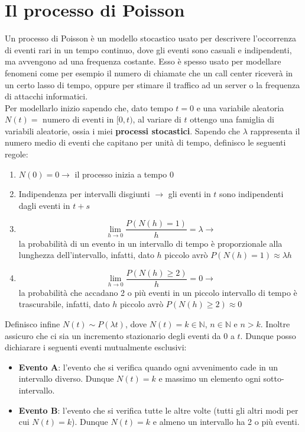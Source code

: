 \documentclass[11pt]{report}
\begin{document}
\section{Il processo di Poisson}
Un processo di Poisson è un modello stocastico usato per descrivere l'occorrenza di eventi rari in un tempo continuo, dove gli eventi sono casuali e indipendenti, ma avvengono ad una frequenza costante. Esso è spesso usato per modellare fenomeni come per esempio il numero di chiamate che un call center riceverà in un certo lasso di tempo, oppure per stimare il traffico ad un server o la frequenza di attacchi informatici.\\
Per modellarlo inizio sapendo che, dato tempo $t=0$ e una variabile aleatoria $N(t)=\text{ numero di eventi in } [0,t)$, al variare di $t$ ottengo una famiglia di variabili aleatorie, ossia i miei \textbf{processi stocastici}. Sapendo che $\lambda$ rappresenta il numero medio di eventi che capitano per unità di tempo, definisco le seguenti regole:
\begin{enumerate}
    \item $N(0) = 0 \longrightarrow$ il processo inizia a tempo 0
    \item Indipendenza per intervalli disgiunti $\longrightarrow$ gli eventi in $t$ sono indipendenti dagli eventi in $t+s$
    \item \[ \lim_{h \rightarrow 0} \frac{P(N(h)=1)}{h} = \lambda \longrightarrow \] la probabilità di un evento in un intervallo di tempo è proporzionale alla lunghezza dell'intervallo, infatti, dato $h$ piccolo avrò $P(N(h)=1) \approx \lambda h$
    \item \[ \lim_{h \rightarrow 0} \frac{P(N(h) \geq 2)}{h} = 0 \longrightarrow \] la probabilità che accadano 2 o più eventi in un piccolo intervallo di tempo è trascurabile, infatti, dato $h$ piccolo avrò $P(N(h) \geq 2) \approx 0$
\end{enumerate}
Definisco infine $N(t) \sim P(\lambda t)$, dove $N(t) = k \in \mathbb{N}$, $n \in \mathbb{N}$ e $n > k$. Inoltre assicuro che ci sia un incremento stazionario degli eventi da 0 a $t$. Dunque posso dichiarare i seguenti eventi mutualmente esclusivi:
\begin{itemize}
    \item \textbf{Evento A}: l'evento che si verifica quando ogni avvenimento cade in un intervallo diverso. Dunque $N(t)=k$ e massimo un elemento ogni sotto-intervallo.
    \item \textbf{Evento B}: l'evento che si verifica tutte le altre volte (tutti gli altri modi per cui $N(t)=k$). Dunque $N(t)=k$ e almeno un intervallo ha 2 o più eventi.
\end{itemize}
\end{document}
